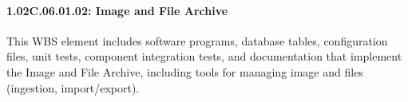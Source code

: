 \paragraph*{1.02C.06.01.02: Image and File Archive}

This WBS element includes software programs, database tables, configuration files, unit tests, component integration tests, and documentation that implement the Image and File Archive, including tools for managing image and files (ingestion, import/export).
